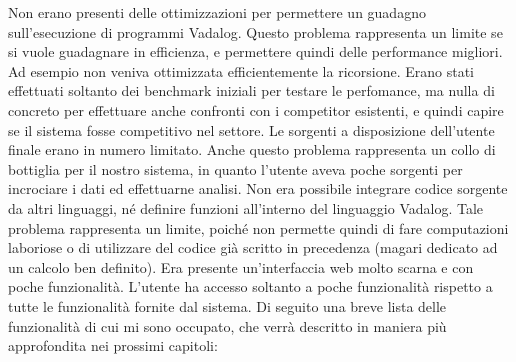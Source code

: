 Non erano presenti delle ottimizzazioni per permettere un guadagno sull'esecuzione di programmi Vadalog. Questo problema rappresenta un limite se si vuole guadagnare in efficienza, e permettere quindi delle performance migliori. Ad esempio non veniva ottimizzata efficientemente la ricorsione. \newline
Erano stati effettuati soltanto dei benchmark iniziali per testare le perfomance, ma nulla di concreto per effettuare anche confronti con i competitor esistenti, e quindi capire se il sistema fosse competitivo nel settore. \newline
Le sorgenti a disposizione dell'utente finale erano in numero limitato. Anche questo problema rappresenta un collo di bottiglia per il nostro sistema, in quanto l'utente aveva poche sorgenti per incrociare i dati ed effettuarne analisi. \newline
Non era possibile integrare codice sorgente da altri linguaggi, né definire funzioni all'interno del linguaggio Vadalog. Tale problema rappresenta un limite, poiché non permette quindi di fare computazioni laboriose o di utilizzare del codice già scritto in precedenza (magari dedicato ad un calcolo ben definito). \newline
Era presente un'interfaccia web molto scarna e con poche funzionalità. L'utente ha accesso soltanto a poche funzionalità rispetto a tutte le funzionalità fornite dal sistema. \newline
Di seguito una breve lista delle funzionalità di cui mi sono occupato, che verrà descritto in maniera più approfondita nei prossimi capitoli:
